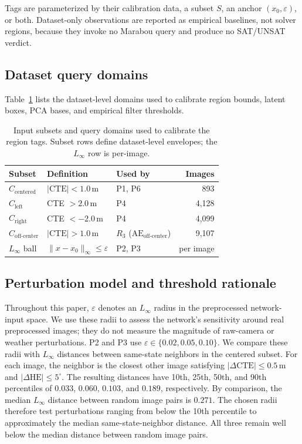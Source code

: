 \documentclass[twocolumn,smallextended,runningheads]{svjour3}
\newcommand{\sttttablefont}{\footnotesize}
\begin{document}
Tags are parameterized by their calibration data, a subset $S$, an anchor $(x_0,\varepsilon)$, or both. Dataset-only observations are reported as empirical baselines, not solver regions, because they invoke no Marabou query and produce no SAT/UNSAT verdict.

\subsection{Dataset query domains}
\label{sec:input_regions}

Table~\ref{tab:regions} lists the dataset-level domains used to calibrate region bounds, latent boxes, PCA bases, and empirical filter thresholds.

\begin{table}[!h]
\centering
\sttttablefont
\setlength{\tabcolsep}{3pt}
\begin{tabular}{lllr}
\toprule
Subset & Definition & Used by & Images \\
\midrule
$C_\text{centered}$ & $|\text{CTE}| < 1.0$\,m & P1, P6 & 893 \\
$C_\text{left}$ & CTE $> 2.0$\,m & P4 & 4{,}128 \\
$C_\text{right}$ & CTE $< -2.0$\,m & P4 & 4{,}099 \\
$C_\text{off-center}$ & $|\text{CTE}| > 1.0$\,m & $R_3$ ($\mathrm{AE}_\text{off-center}$) & 9{,}107 \\
$L_\infty$ ball & $\|x - x_0\|_\infty \le \varepsilon$ & P2, P3 & per image \\
\bottomrule
\end{tabular}
\caption{Input subsets and query domains used to calibrate the region tags. Subset rows define dataset-level envelopes; the $L_\infty$ row is per-image.}
\label{tab:regions}
\end{table}

\subsection{Perturbation model and threshold rationale}
\label{sec:perturbation_model}

Throughout this paper, $\varepsilon$ denotes an $L_\infty$ radius in the preprocessed network-input space. We use these radii to assess the network's sensitivity around real preprocessed images; they do not measure the magnitude of raw-camera or weather perturbations. P2 and P3 use $\varepsilon \in \{0.02, 0.05, 0.10\}$. We compare these radii with $L_\infty$ distances between same-state neighbors in the centered subset. For each image, the neighbor is the closest other image satisfying $|\Delta\text{CTE}|{\le}0.5$\,m and $|\Delta\text{HE}|{\le}5^\circ$. The resulting distances have 10th, 25th, 50th, and 90th percentiles of $0.033$, $0.060$, $0.103$, and $0.189$, respectively. By comparison, the median $L_\infty$ distance between random image pairs is $0.271$. The chosen radii therefore test perturbations ranging from below the 10th percentile to approximately the median same-state-neighbor distance. All three remain well below the median distance between random image pairs.
\end{document}
